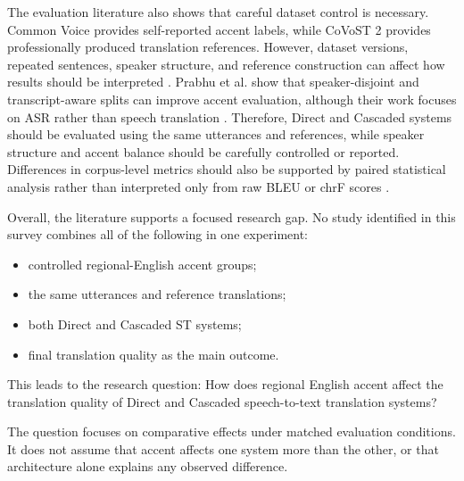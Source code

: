 The evaluation literature also shows that careful dataset control is
necessary. Common Voice provides self-reported accent labels, while CoVoST 2
provides professionally produced translation references. However, dataset
versions, repeated sentences, speaker structure, and reference construction
can affect how results should be interpreted
\cite{ardila2020commonvoice,wang2021covost2}. Prabhu et al. show that
speaker-disjoint and transcript-aware splits can improve accent evaluation,
although their work focuses on ASR rather than speech translation
\cite{prabhu2023accentcodebooks}. Therefore, Direct and Cascaded systems should
be evaluated using the same utterances and references, while speaker structure
and accent balance should be carefully controlled or reported. Differences in
corpus-level metrics should also be supported by paired statistical analysis
rather than interpreted only from raw BLEU or chrF scores
\cite{papineni2002bleu,post2018clarity,koehn2004significance}.

Overall, the literature supports a focused research gap. No study identified
in this survey combines all of the following in one experiment:

\begin{itemize}
  \item controlled regional-English accent groups;
  \item the same utterances and reference translations;
  \item both Direct and Cascaded ST systems;
  \item final translation quality as the main outcome.
\end{itemize}

This leads to the research question: How does regional English accent
affect the translation quality of Direct and Cascaded speech-to-text
translation systems?

The question focuses on comparative effects under matched evaluation
conditions. It does not assume that accent affects one system more than the
other, or that architecture alone explains any observed difference.
